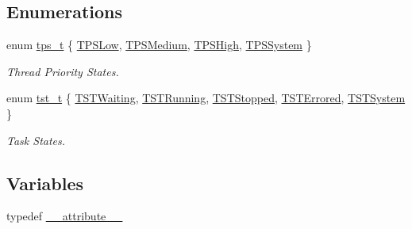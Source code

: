 \subsection*{Enumerations}
\begin{DoxyCompactItemize}
\item 
enum \hyperlink{a00065_a5ee504524d7b79ed81a1ed7b325dc9c6_a5ee504524d7b79ed81a1ed7b325dc9c6}{tps\+\_\+t} \{ \hyperlink{a00065_a5ee504524d7b79ed81a1ed7b325dc9c6_a5ee504524d7b79ed81a1ed7b325dc9c6a9d68d2bd5bb4b7a813b53a3c6efb26a3}{T\+P\+S\+Low}, 
\hyperlink{a00065_a5ee504524d7b79ed81a1ed7b325dc9c6_a5ee504524d7b79ed81a1ed7b325dc9c6ab65c1c2b03accd655caa87db240a87db}{T\+P\+S\+Medium}, 
\hyperlink{a00065_a5ee504524d7b79ed81a1ed7b325dc9c6_a5ee504524d7b79ed81a1ed7b325dc9c6a99b1e5d2af2ea961d67a5d0f982fb0c2}{T\+P\+S\+High}, 
\hyperlink{a00065_a5ee504524d7b79ed81a1ed7b325dc9c6_a5ee504524d7b79ed81a1ed7b325dc9c6a557f7fd60ef979a8df84e7eea7de9f9b}{T\+P\+S\+System}
 \}\begin{DoxyCompactList}\small\item\em Thread Priority States. \end{DoxyCompactList}
\item 
enum \hyperlink{a00065_a3895f03bb811310833570ff0b8a403d9_a3895f03bb811310833570ff0b8a403d9}{tst\+\_\+t} \{ \newline
\hyperlink{a00065_a3895f03bb811310833570ff0b8a403d9_a3895f03bb811310833570ff0b8a403d9a4e9798f9291920da4dba13ed8d1bf2b4}{T\+S\+T\+Waiting}, 
\hyperlink{a00065_a3895f03bb811310833570ff0b8a403d9_a3895f03bb811310833570ff0b8a403d9ac0336457632847436b12bd36b2642808}{T\+S\+T\+Running}, 
\hyperlink{a00065_a3895f03bb811310833570ff0b8a403d9_a3895f03bb811310833570ff0b8a403d9a29a580a1a7b4350246c83d171567f7fc}{T\+S\+T\+Stopped}, 
\hyperlink{a00065_a3895f03bb811310833570ff0b8a403d9_a3895f03bb811310833570ff0b8a403d9a8117b53a7299ca12df9b2a7bd320689f}{T\+S\+T\+Errored}, 
\newline
\hyperlink{a00065_a3895f03bb811310833570ff0b8a403d9_a3895f03bb811310833570ff0b8a403d9a1b2cdb1c39a3cb21ddb3efc42d1cc5b9}{T\+S\+T\+System}
 \}\begin{DoxyCompactList}\small\item\em Task States. \end{DoxyCompactList}
\end{DoxyCompactItemize}
\subsection*{Variables}
\begin{DoxyCompactItemize}
\item 
typedef \hyperlink{a00065_acf8c839d8a7a12772ebd4b8a4c087034_acf8c839d8a7a12772ebd4b8a4c087034}{\+\_\+\+\_\+attribute\+\_\+\+\_\+}
\end{DoxyCompactItemize}



